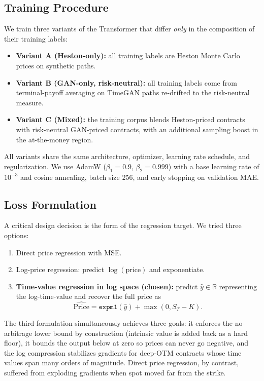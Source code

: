 \documentclass[conference]{IEEEtran}
\begin{document}
\subsection{Training Procedure}

We train three variants of the Transformer that differ
\emph{only} in the composition of their training labels:

\begin{itemize}
\item \textbf{Variant A (Heston-only):} all training labels are
Heston Monte Carlo prices on synthetic paths.
\item \textbf{Variant B (GAN-only, risk-neutral):} all training
labels come from terminal-payoff averaging on TimeGAN paths
re-drifted to the risk-neutral measure.
\item \textbf{Variant C (Mixed):} the training corpus blends
Heston-priced contracts with risk-neutral GAN-priced contracts,
with an additional sampling boost in the at-the-money region.
\end{itemize}

All variants share the same architecture, optimizer, learning
rate schedule, and regularization. We use AdamW
($\beta_1 = 0.9$, $\beta_2 = 0.999$) with a base learning rate
of $10^{-3}$ and cosine annealing, batch size 256, and early
stopping on validation MAE.

\subsection{Loss Formulation}

A critical design decision is the form of the regression
target. We tried three options:
\begin{enumerate}
\item Direct price regression with MSE.
\item Log-price regression: predict $\log(\text{price})$ and
exponentiate.
\item \textbf{Time-value regression in log space (chosen):}
predict $\hat{y} \in \mathbb{R}$ representing the log-time-value
and recover the full price as
\begin{equation}
\widehat{\text{Price}} = \texttt{expm1}(\hat{y}) + \max(0, S_T - K).
\label{eq:invtransform}
\end{equation}
\end{enumerate}

The third formulation simultaneously achieves three goals: it
enforces the no-arbitrage lower bound by construction
(intrinsic value is added back as a hard floor), it bounds the
output below at zero so prices can never go negative, and the
log compression stabilizes gradients for deep-OTM contracts
whose time values span many orders of magnitude. Direct price
regression, by contrast, suffered from exploding gradients
when spot moved far from the strike.
\end{document}
